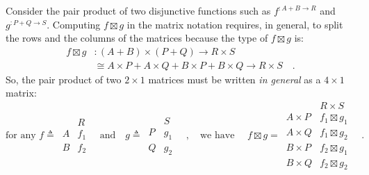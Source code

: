 Consider the pair product of two disjunctive functions such as $f^{:A+B\rightarrow R}$
and $g^{:P+Q\rightarrow S}$. Computing $f\boxtimes g$ in the matrix
notation requires, in general, to split the rows and the columns of
the matrices because the type of $f\boxtimes g$ is:
\begin{align*}
f\boxtimes g & :(A+B)\times(P+Q)\rightarrow R\times S\\
 & \cong A\times P+A\times Q+B\times P+B\times Q\rightarrow R\times S\quad.
\end{align*}
So, the pair product of two $2\times1$ matrices must be written \emph{in
general} as a $4\times1$ matrix:
\[
\text{for any }f\triangleq\,\begin{array}{|c||c|}
 & R\\
\hline A & f_{1}\\
B & f_{2}
\end{array}\quad\text{and}\quad g\triangleq\,\begin{array}{|c||c|}
 & S\\
\hline P & g_{1}\\
Q & g_{2}
\end{array}\quad,\quad\text{we have }\quad f\boxtimes g=\,\begin{array}{|c||c|}
 & R\times S\\
\hline A\times P & f_{1}\boxtimes g_{1}\\
A\times Q & f_{1}\boxtimes g_{2}\\
B\times P & f_{2}\boxtimes g_{1}\\
B\times Q & f_{2}\boxtimes g_{2}
\end{array}\quad.
\]

